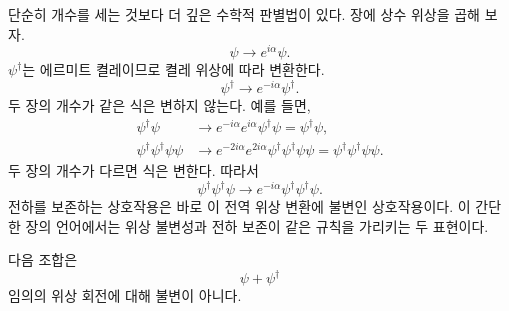 \begin{classroomqa}
\end{classroomqa}

단순히 개수를 세는 것보다 더 깊은 수학적 판별법이 있다. 장에 상수 위상을 곱해 보자.
\begin{equation}
\psi\longrightarrow e^{i\alpha}\psi.
\end{equation}
\(\psi^\dagger\)는 에르미트 켤레이므로 켤레 위상에 따라 변환한다.
\begin{equation}
\psi^\dagger\longrightarrow e^{-i\alpha}\psi^\dagger.
\end{equation}
두 장의 개수가 같은 식은 변하지 않는다. 예를 들면,
\begin{align}
\psi^\dagger\psi
&\longrightarrow
e^{-i\alpha}e^{i\alpha}\psi^\dagger\psi
=\psi^\dagger\psi,\\
\psi^\dagger\psi^\dagger\psi\psi
&\longrightarrow
e^{-2i\alpha}e^{2i\alpha}
\psi^\dagger\psi^\dagger\psi\psi
=\psi^\dagger\psi^\dagger\psi\psi.
\end{align}
두 장의 개수가 다르면 식은 변한다. 따라서
\begin{equation}
\psi^\dagger\psi^\dagger\psi
\longrightarrow
e^{-i\alpha}\psi^\dagger\psi^\dagger\psi.
\end{equation}
전하를 보존하는 상호작용은 바로 이 전역 위상 변환에 불변인 상호작용이다. 이 간단한 장의 언어에서는 위상 불변성과 전하 보존이 같은 규칙을 가리키는 두 표현이다.

다음 조합은
\begin{equation}
\psi+\psi^\dagger
\end{equation}
임의의 위상 회전에 대해 불변이 아니다.

\begin{classroomqa}
\end{classroomqa}

\begin{classroomqa}
\end{classroomqa}

